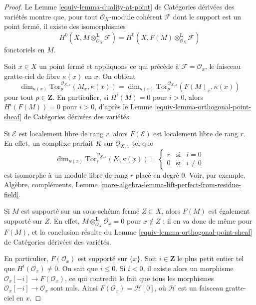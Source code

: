 \begin{proof}
Le Lemme \ref{equiv-lemma-duality-at-point} de Catégories dérivées des
variétés montre que, pour tout $\mathcal{O}_X$-module cohérent
$\mathcal{F}$ dont le support est un point fermé, il existe des
isomorphismes
$$
H^0(X, M \otimes^\mathbf{L}_{\mathcal{O}_X} \mathcal{F}) =
H^0(X, F(M) \otimes^\mathbf{L}_{\mathcal{O}_X} \mathcal{F})
$$
fonctoriels en $M$.

\medskip\noindent
Soit $x \in X$ un point fermé et appliquons ce qui précède à
$\mathcal{F} = \mathcal{O}_x$, le faisceau gratte-ciel de fibre
$\kappa(x)$ en $x$. On obtient
$$
\dim_{\kappa(x)}
\text{Tor}^{\mathcal{O}_{X, x}}_p(M_x, \kappa(x)) =
\dim_{\kappa(x)}
\text{Tor}^{\mathcal{O}_{X, x}}_p(F(M)_x, \kappa(x))
$$
pour tout $p \in \mathbf{Z}$. En particulier, si $H^i(M) = 0$ pour
$i > 0$, alors $H^i(F(M)) = 0$ pour $i > 0$, d'après le Lemme
\ref{equiv-lemma-orthogonal-point-sheaf} de Catégories dérivées des
variétés.

\medskip\noindent
Si $\mathcal{E}$ est localement libre de rang $r$, alors
$F(\mathcal{E})$ est localement libre de rang $r$. En effet, un complexe
parfait $K$ sur $\mathcal{O}_{X, x}$ tel que
$$
\dim_{\kappa(x)} \text{Tor}^{\mathcal{O}_{X, x}}_i(K, \kappa(x)) =
\left\{
\begin{matrix}
r & \text{si} & i = 0 \\
0 & \text{si} & i \not = 0
\end{matrix}
\right.
$$
est isomorphe à un module libre de rang $r$ placé en degré $0$. Voir, par
exemple, Algèbre, compléments, Lemme
\ref{more-algebra-lemma-lift-perfect-from-residue-field}.

\medskip\noindent
Si $M$ est supporté sur un sous-schéma fermé $Z \subset X$, alors $F(M)$
est également supporté sur $Z$. En effet,
$M \otimes_{\mathcal{O}_X}^\mathbf{L} \mathcal{O}_x = 0$ pour
$x \not \in Z$ ; il en va donc de même pour $F(M)$, et la conclusion
résulte du Lemme \ref{equiv-lemma-orthogonal-point-sheaf} de Catégories
dérivées des variétés.

\medskip\noindent
En particulier, $F(\mathcal{O}_x)$ est supporté sur $\{x\}$. Soit
$i \in \mathbf{Z}$ le plus petit entier tel que
$H^i(\mathcal{O}_x) \not = 0$. On sait que $i \leq 0$. Si $i < 0$,
il existe alors un morphisme
$\mathcal{O}_x[-i] \to F(\mathcal{O}_x)$, ce qui contredit le fait que
tous les morphismes $\mathcal{O}_x[-i] \to \mathcal{O}_x$ sont nuls.
Ainsi $F(\mathcal{O}_x) = \mathcal{H}[0]$, où $\mathcal{H}$ est un
faisceau gratte-ciel en $x$.


\end{proof}
